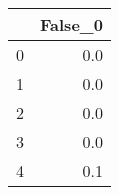 \begin{tabular}{lr}
\toprule
{} &  False\_0 \\ \hline
\midrule
0 &      0.0 \\ \hline
1 &      0.0 \\ \hline
2 &      0.0 \\ \hline
3 &      0.0 \\ \hline
4 &      0.1 \\ \hline
\bottomrule
\end{tabular}
